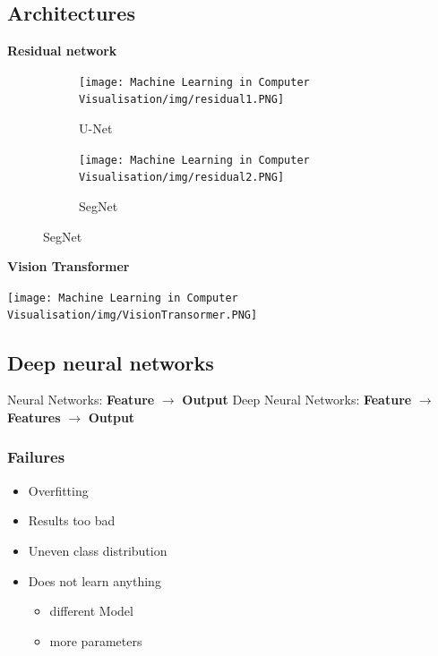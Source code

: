 \documentclass[x11names,11pt,a4paper]{article}
\theoremstyle{definition}
\begin{document}
\subsection{Architectures}
\textbf{Residual network}
\begin{figure}[H]
     \centering
     \begin{subfigure}[b]{0.30\textwidth}
         \centering
         \texttt{[image: Machine Learning in Computer Visualisation/img/residual1.PNG]}
         \caption{U-Net}
     \end{subfigure}
     \hfill
     \begin{subfigure}[b]{0.69\textwidth}
         \centering
         \texttt{[image: Machine Learning in Computer Visualisation/img/residual2.PNG]}
         \caption{SegNet}
     \end{subfigure}
\end{figure}
\textbf{Vision Transformer}
\begin{center}
	\texttt{[image: Machine Learning in Computer Visualisation/img/VisionTransormer.PNG]}
\end{center}

\subsection{Deep neural networks}
Neural Networks: \textbf{Feature} $\rightarrow$ \textbf{Output} \newline
Deep Neural Networks: \textbf{Feature} $\rightarrow$ \textbf{Features} $\rightarrow$ \textbf{Output}
\subsubsection{Failures}
\begin{itemize}
    \item Overfitting
    \item Results too bad
    \item Uneven class distribution
    \item Does not learn anything
    \begin{itemize}
        \item different Model
        \item more parameters
    \end{itemize}
\end{itemize}
\end{document}
